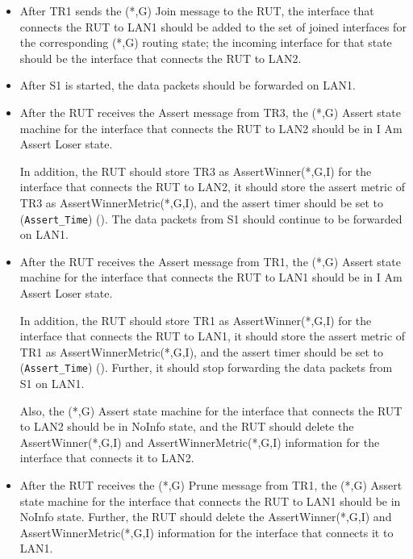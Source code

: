 \documentclass[11pt]{report}
\begin{document}
\begin{itemize}

  \item After TR1 sends the (*,G) Join message to the RUT, the interface that
  connects the RUT to LAN1 should be added to the set of joined interfaces for
  the corresponding (*,G) routing state; the incoming interface for that state
  should be the interface that connects the RUT to LAN2.

  \item After S1 is started, the data packets should be forwarded on LAN1.

  \item After the RUT receives the Assert message from TR3, the (*,G)
  Assert state machine for the interface that connects the RUT to LAN2 should
  be in I Am Assert Loser state.

  In addition, the RUT should store TR3 as AssertWinner(*,G,I) for the
  interface that connects the RUT to LAN2, it should store the assert metric
  of TR3 as AssertWinnerMetric(*,G,I), and the assert timer should be set to
  (\verb=Assert_Time=) ({\PimsmAssertTime}).
  The data packets from S1 should continue to be forwarded on LAN1.

  \item After the RUT receives the Assert message from TR1, the (*,G)
  Assert state machine for the interface that connects the RUT to LAN1 should
  be in I Am Assert Loser state.

  In addition, the RUT should store TR1 as AssertWinner(*,G,I) for the
  interface that connects the RUT to LAN1, it should store the assert metric
  of TR1 as AssertWinnerMetric(*,G,I), and the assert timer should be set to
  (\verb=Assert_Time=) ({\PimsmAssertTime}).
  Further, it should stop forwarding the data packets from S1 on LAN1.

  Also, the (*,G) Assert state machine for the interface that connects the RUT
  to LAN2 should be in NoInfo state, and the RUT should delete the
  AssertWinner(*,G,I) and AssertWinnerMetric(*,G,I) information for the
  interface that connects it to LAN2.

  \item After the RUT receives the (*,G) Prune message from TR1, the (*,G)
  Assert state machine for the interface that connects the RUT to LAN1 should
  be in NoInfo state.
  Further, the RUT should delete the AssertWinner(*,G,I) and
  AssertWinnerMetric(*,G,I) information for the interface that connects it to
  LAN1.

\end{itemize}
\end{document}

